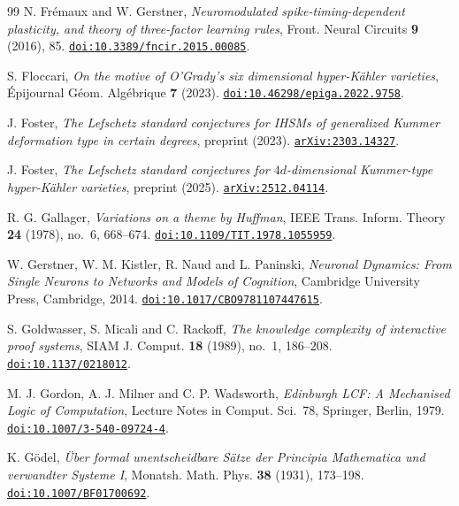 \begin{thebibliography}{99}
N. Fr\'emaux and W. Gerstner,
\emph{Neuromodulated spike-timing-dependent plasticity, and theory of three-factor learning rules},
Front. Neural Circuits \textbf{9} (2016), 85.
\href{https://doi.org/10.3389/fncir.2015.00085}{\nolinkurl{doi:10.3389/fncir.2015.00085}}.

S. Floccari,
\emph{On the motive of O'Grady's six dimensional hyper-K\"ahler varieties},
\'Epijournal G\'eom. Alg\'ebrique \textbf{7} (2023).
\href{https://doi.org/10.46298/epiga.2022.9758}{\nolinkurl{doi:10.46298/epiga.2022.9758}}.

J. Foster,
\emph{The Lefschetz standard conjectures for IHSMs of generalized Kummer deformation type in certain degrees},
preprint (2023).
\href{https://arxiv.org/abs/2303.14327}{\nolinkurl{arXiv:2303.14327}}.

J. Foster,
\emph{The Lefschetz standard conjectures for $4d$-dimensional Kummer-type hyper-K\"ahler varieties},
preprint (2025).
\href{https://arxiv.org/abs/2512.04114}{\nolinkurl{arXiv:2512.04114}}.

R. G. Gallager,
\emph{Variations on a theme by Huffman},
IEEE Trans. Inform. Theory \textbf{24} (1978), no.~6, 668--674.
\href{https://doi.org/10.1109/TIT.1978.1055959}{\nolinkurl{doi:10.1109/TIT.1978.1055959}}.

W. Gerstner, W. M. Kistler, R. Naud and L. Paninski,
\emph{Neuronal Dynamics: From Single Neurons to Networks and Models of Cognition},
Cambridge University Press, Cambridge, 2014.
\href{https://doi.org/10.1017/CBO9781107447615}{\nolinkurl{doi:10.1017/CBO9781107447615}}.

S. Goldwasser, S. Micali and C. Rackoff,
\emph{The knowledge complexity of interactive proof systems},
SIAM J. Comput. \textbf{18} (1989), no.~1, 186--208.
\href{https://doi.org/10.1137/0218012}{\nolinkurl{doi:10.1137/0218012}}.

M. J. Gordon, A. J. Milner and C. P. Wadsworth,
\emph{Edinburgh LCF: A Mechanised Logic of Computation},
Lecture Notes in Comput. Sci.~78, Springer, Berlin, 1979.
\href{https://doi.org/10.1007/3-540-09724-4}{\nolinkurl{doi:10.1007/3-540-09724-4}}.

K. G\"odel,
\emph{\"Uber formal unentscheidbare S\"atze der Principia Mathematica und verwandter Systeme I},
Monatsh. Math. Phys. \textbf{38} (1931), 173--198.
\href{https://doi.org/10.1007/BF01700692}{\nolinkurl{doi:10.1007/BF01700692}}.


\end{thebibliography}
